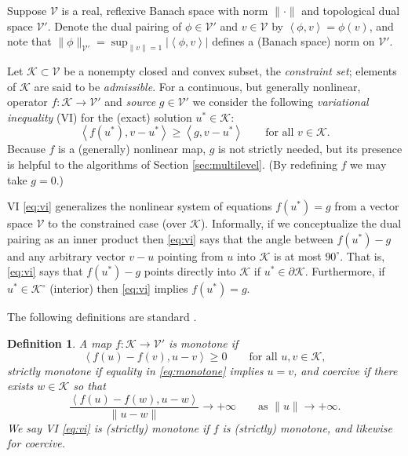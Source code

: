 \documentclass[letterpaper,final,12pt,reqno]{amsart}
\theoremstyle{cstyle}
\theoremstyle{cstyle*}
\theoremstyle{dstyle}
\newtheorem{definition}[theorem]{Definition}
\numberwithin{equation}{section}
\numberwithin{figure}{section}
\numberwithin{table}{section}
\numberwithin{theorem}{section}
\newcommand{\cK}{\mathcal{K}}
\newcommand{\cV}{\mathcal{V}}
\newcommand{\ip}[2]{\left<#1,#2\right>}
\begin{document}
Suppose $\cV$ is a real, reflexive Banach space with norm $\|\cdot\|$ and topological dual space $\cV'$.  Denote the dual pairing of $\phi \in \cV'$ and $v\in\cV$ by $\ip{\phi}{v} = \phi(v)$, and note that $\|\phi\|_{\cV'} = \sup_{\|v\|=1} |\ip{\phi}{v}|$ defines a (Banach space) norm on $\cV'$.

Let $\cK \subset \cV$ be a nonempty closed and convex subset, the \emph{constraint set}; elements of $\cK$ are said to be \emph{admissible}.  For a continuous, but generally nonlinear, operator $f:\cK \to \cV'$ and \emph{source} $g\in \cV'$ we consider the following \emph{variational inequality} (VI) for the (exact) solution $u^*\in \cK$:
\begin{equation}
\ip{f(u^*)}{v-u^*} \ge \ip{g}{v-u^*} \qquad \text{for all } v\in \cK. \label{eq:vi}
\end{equation}
Because $f$ is a (generally) nonlinear map, $g$ is not strictly needed, but its presence is helpful to the algorithms of Section \ref{sec:multilevel}.  (By redefining $f$ we may take $g=0$.)

VI \eqref{eq:vi} generalizes the nonlinear system of equations $f(u^*)=g$ from a vector space $\cV$ to the constrained case (over $\cK$).  Informally, if we conceptualize the dual pairing as an inner product then \eqref{eq:vi} says that the angle between $f(u^*)-g$ and any arbitrary vector $v-u$ pointing from $u$ into $\cK$ is at most $90^\circ$.  That is, \eqref{eq:vi} says that $f(u^*)-g$ points directly into $\cK$ if $u^* \in\partial\cK$.  Furthermore, if $u^* \in \cK^\circ$ (interior) then \eqref{eq:vi} implies $f(u^*)=g$.

The following definitions are standard \cite{KinderlehrerStampacchia1980}.

\begin{definition} A map $f:\cK \to \cV'$ is \emph{monotone} if
\begin{equation}
\ip{f(u)-f(v)}{u-v} \ge 0 \qquad \text{for all } u,v \in \cK, \label{eq:monotone}
\end{equation}
\emph{strictly monotone} if equality in \eqref{eq:monotone} implies $u=v$, and \emph{coercive} if there exists $w \in \cK$ so that
\begin{equation}
\frac{\ip{f(u)-f(w)}{u-w}}{\|u-w\|} \to +\infty \qquad \text{as } \|u\|\to +\infty. \label{eq:coercive}
\end{equation}
We say VI \eqref{eq:vi} is (\emph{strictly}) \emph{monotone} if $f$ is (strictly) monotone, and likewise for \emph{coercive}.
\end{definition}
\end{document}
